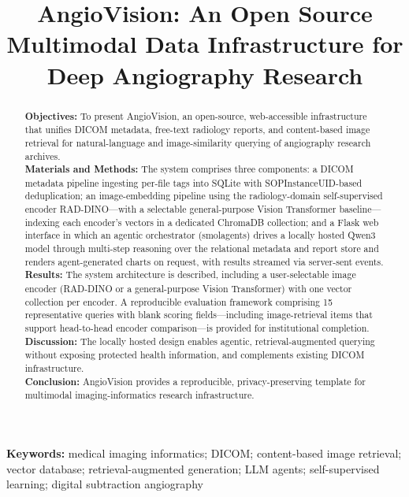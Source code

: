 \documentclass[11pt]{article}
\title{\textbf{AngioVision: An Open Source Multimodal Data Infrastructure for
Deep Angiography Research}}
\date{}
\begin{document}
\maketitle

\begin{abstract}
\noindent\textbf{Objectives:} To present AngioVision, an open-source,
web-accessible infrastructure that unifies DICOM metadata, free-text radiology
reports, and content-based image retrieval for natural-language and
image-similarity querying of angiography research archives.\\
\textbf{Materials and Methods:} The system comprises three components: a DICOM
metadata pipeline ingesting per-file tags into SQLite with SOPInstanceUID-based
deduplication; an image-embedding pipeline using the radiology-domain
self-supervised encoder RAD-DINO---with a selectable general-purpose Vision
Transformer baseline---indexing each encoder's vectors in a dedicated ChromaDB
collection; and a Flask web interface in which an agentic orchestrator
(smolagents) drives a locally hosted Qwen3 model through multi-step reasoning
over the relational metadata and report store and renders agent-generated charts
on request, with results streamed via server-sent events.\\
\textbf{Results:} The system architecture is described, including a
user-selectable image encoder (RAD-DINO or a general-purpose Vision Transformer)
with one vector collection per encoder. A reproducible evaluation framework
comprising 15 representative queries with blank scoring fields---including
image-retrieval items that support head-to-head encoder comparison---is provided
for institutional completion.\\
\textbf{Discussion:} The locally hosted design enables agentic,
retrieval-augmented querying without exposing protected health information,
and complements existing DICOM infrastructure.\\
\textbf{Conclusion:} AngioVision provides a reproducible, privacy-preserving
template for multimodal imaging-informatics research infrastructure.
\end{abstract}

\noindent\textbf{Keywords:} medical imaging informatics; DICOM; content-based
image retrieval; vector database; retrieval-augmented generation; LLM agents;
self-supervised learning; digital subtraction angiography

\vspace{0.5em}
\end{document}
